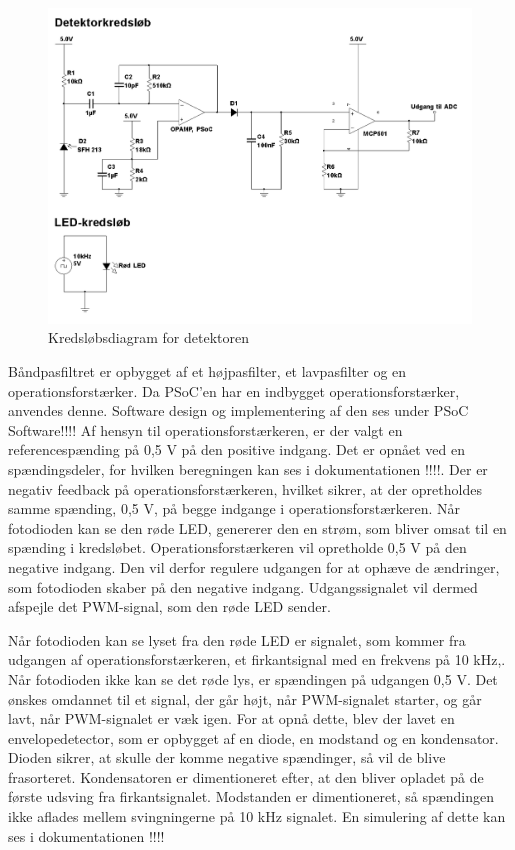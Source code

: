 \begin{figure}[H]
	\centering
	\includegraphics[width=\textwidth]{Afsnit/DesignOgImplementering/images/detektor_tandhjul}
	\caption{Kredsløbsdiagram for detektoren}
	\label{fig:detektortand}
\end{figure}

Båndpasfiltret er opbygget af et højpasfilter, et lavpasfilter og en operationsforstærker. Da PSoC'en har en indbygget operationsforstærker, anvendes denne. Software design og implementering af den ses under PSoC Software!!!! Af hensyn til operationsforstærkeren, er der valgt en referencespænding på 0,5 V på den positive indgang. Det er opnået ved en spændingsdeler, for hvilken beregningen kan ses i dokumentationen !!!!. Der er negativ feedback på operationsforstærkeren, hvilket sikrer, at der opretholdes samme spænding, 0,5 V, på begge indgange i operationsforstærkeren. Når fotodioden kan se den røde LED, genererer den en strøm, som bliver omsat til en spænding i kredsløbet. Operationsforstærkeren vil opretholde 0,5 V på den negative indgang. Den vil derfor regulere udgangen for at ophæve de ændringer, som fotodioden skaber på den negative indgang. Udgangssignalet vil dermed afspejle det PWM-signal, som den røde LED sender.  

Når fotodioden kan se lyset fra den røde LED er signalet, som kommer fra udgangen af operationsforstærkeren, et firkantsignal med en frekvens på 10 kHz,. Når fotodioden ikke kan se det røde lys, er spændingen på udgangen 0,5 V. Det ønskes omdannet til et signal, der går højt, når PWM-signalet starter, og går lavt, når PWM-signalet er væk igen. For at opnå dette, blev der lavet en envelopedetector, som er opbygget af en diode, en modstand og en kondensator. Dioden sikrer, at skulle der komme negative spændinger, så vil de blive frasorteret. Kondensatoren er dimentioneret efter, at den bliver opladet på de første udsving fra firkantsignalet. Modstanden er dimentioneret, så spændingen ikke aflades mellem svingningerne på 10 kHz signalet. En simulering af dette kan ses i dokumentationen !!!! 

